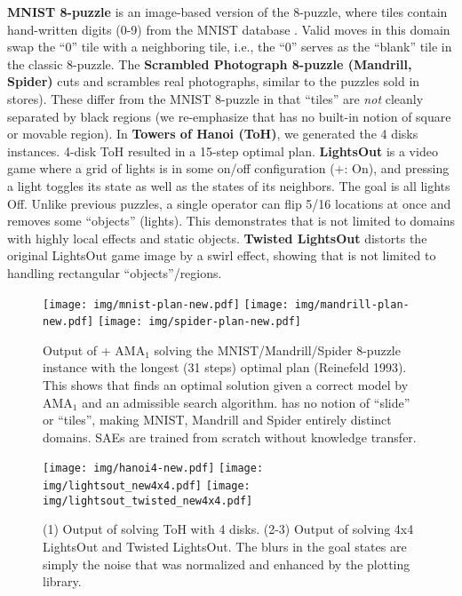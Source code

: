 \documentclass[11pt]{article}
\begin{document}
\textbf{MNIST 8-puzzle}
is an image-based version of the 8-puzzle, where tiles contain hand-written digits (0-9) from the  MNIST database \cite{lecun1998gradient}.
Valid moves in this domain swap the ``0'' tile  with a neighboring tile, i.e., the ``0'' serves as the ``blank'' tile in the classic 8-puzzle. 
The \textbf{Scrambled Photograph 8-puzzle (Mandrill, Spider)} cuts and scrambles real photographs, similar to the puzzles sold in stores).
These differ from the MNIST 8-puzzle in that ``tiles'' are \textit{not} cleanly separated by black regions
(we re-emphasize that \latentplanner has no built-in notion of square or movable region).
In \textbf{Towers of Hanoi (ToH)},
we generated the 4 disks instances.
4-disk ToH resulted in a 15-step optimal plan.
\textbf{LightsOut} is
a video game where a grid of lights is in some on/off configuration ($+$: On),
and pressing a light toggles its state as well as the states of its neighbors.
The goal is all lights Off.
Unlike previous puzzles, a single operator can flip 5/16 locations at once and
removes some ``objects'' (lights).
This demonstrates that \latentplanner is not limited to domains with highly local effects and static objects.
\textbf{Twisted LightsOut} distorts the original LightsOut game image by a swirl effect, 
showing that \latentplanner is not limited to handling rectangular ``objects''/regions.

\begin{figure}[tbp]
 \centering
 \texttt{[image: img/mnist-plan-new.pdf]}
 \texttt{[image: img/mandrill-plan-new.pdf]}
 \texttt{[image: img/spider-plan-new.pdf]}
 \caption{
Output of \latentplanner + AMA$_1$ solving the MNIST/Mandrill/Spider 8-puzzle instance
with the longest (31 steps) optimal plan (Reinefeld 1993).
This shows that \latentplanner finds an optimal solution
given a correct model by AMA$_1$ and an admissible search algorithm.
\latentplanner has no notion of ``slide'' or ``tiles'',
making MNIST, Mandrill and Spider entirely distinct domains.
SAEs are trained from scratch without knowledge transfer.
}
 \label{fig:mnist}
\end{figure}

\begin{figure}[tbp]
 \texttt{[image: img/hanoi4-new.pdf]}
 \texttt{[image: img/lightsout\_new4x4.pdf]}
 \texttt{[image: img/lightsout\_twisted\_new4x4.pdf]}
 \caption{
(1) Output of solving ToH with 4 disks.
(2-3) Output of solving 4x4 LightsOut and Twisted LightsOut.
The blurs in the goal states are simply the noise that was normalized and enhanced by the plotting library.
}
 \label{fig:mnist2}
\end{figure}
\end{document}
